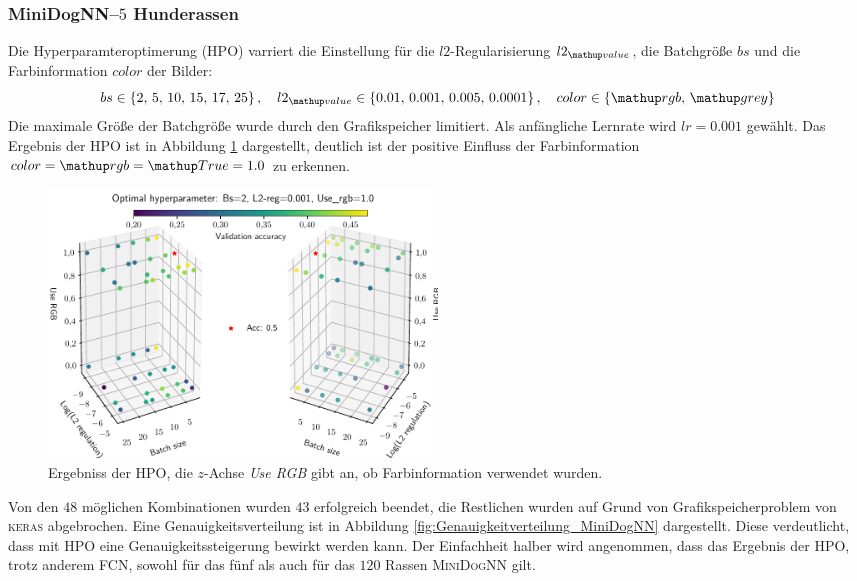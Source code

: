 \subsubsection{MiniDogNN--$5$ Hunderassen}
Die Hyperparamteroptimerung (HPO) varriert die Einstellung
für die $l2$-Regularisierung $l2\ua{value}$, die Batchgröße $bs$
und die Farbinformation $color$ der Bilder:
\begin{equation}
  \label{eq:Parameterraum_MiniDogNN}
  bs\in\left\{2,\, 5, \,10, \,15,\, 17,\, 25\right\}, \quad l2\ua{value}\in\left\{0.01, \,0.001,\, 0.005,\, 0.0001\right\}, \quad color\in\left\{\map{rgb}, \,\map{grey}\right\}
\end{equation}
Die maximale Größe der Batchgröße wurde durch den Grafikspeicher limitiert.
Als anfängliche Lernrate wird $lr=0.001$ gewählt.
Das Ergebnis der HPO ist in Abbildung \ref{fig:Hyperraum_MiniDogNN} dargestellt,
deutlich ist der positive Einfluss der Farbinformation $color=\map{rgb}=\map{True}=1.0$
zu erkennen.
\begin{figure}
\centering
\includegraphics[width=0.5\textwidth]{../../final_data/MiniNN_n5/hyper_raum.pdf}
\caption{Ergebniss der HPO, die $z$-Achse \emph{Use RGB} gibt an, ob Farbinformation
        verwendet wurden.}
\label{fig:Hyperraum_MiniDogNN}
\end{figure}
Von den $48$ möglichen Kombinationen wurden $43$ erfolgreich beendet, die Restlichen
wurden auf Grund von Grafikspeicherproblem von \textsc{keras} abgebrochen. Eine
Genauigkeitsverteilung ist in Abbildung \ref{fig:Genauigkeitverteilung_MiniDogNN}
dargestellt. Diese verdeutlicht, dass mit HPO
eine Genauigkeitssteigerung bewirkt werden kann. Der Einfachheit halber wird
angenommen, dass das Ergebnis der HPO, trotz anderem
FCN, sowohl für das fünf als auch für das $120$ Rassen \textsc{MiniDogNN} gilt.

